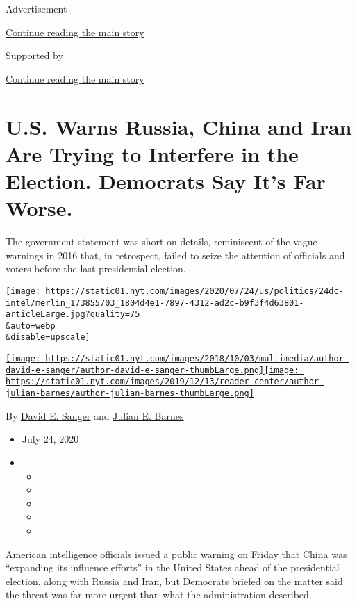 Advertisement

\protect\hyperlink{after-top}{Continue reading the main story}

Supported by

\protect\hyperlink{after-sponsor}{Continue reading the main story}

\hypertarget{us-warns-russia-china-and-iran-are-trying-to-interfere-in-the-election-democrats-say-its-far-worse}{%
\section{U.S. Warns Russia, China and Iran Are Trying to Interfere in
the Election. Democrats Say It's Far
Worse.}\label{us-warns-russia-china-and-iran-are-trying-to-interfere-in-the-election-democrats-say-its-far-worse}}

The government statement was short on details, reminiscent of the vague
warnings in 2016 that, in retrospect, failed to seize the attention of
officials and voters before the last presidential election.

\texttt{[image: https://static01.nyt.com/images/2020/07/24/us/politics/24dc-intel/merlin\_173855703\_1804d4e1-7897-4312-ad2c-b9f3f4d63801-articleLarge.jpg?quality=75\\\&auto=webp\\\&disable=upscale]}

\href{https://www.nytimes.com/by/david-e-sanger}{\texttt{[image: https://static01.nyt.com/images/2018/10/03/multimedia/author-david-e-sanger/author-david-e-sanger-thumbLarge.png]}}\href{https://www.nytimes.com/by/julian-e-barnes}{\texttt{[image: https://static01.nyt.com/images/2019/12/13/reader-center/author-julian-barnes/author-julian-barnes-thumbLarge.png]}}

By \href{https://www.nytimes.com/by/david-e-sanger}{David E. Sanger} and
\href{https://www.nytimes.com/by/julian-e-barnes}{Julian E. Barnes}

\begin{itemize}
\item
  July 24, 2020
\item
  \begin{itemize}
  \item
  \item
  \item
  \item
  \item
  \end{itemize}
\end{itemize}

American intelligence officials issued a public warning on Friday that
China was ``expanding its influence efforts'' in the United States ahead
of the presidential election, along with Russia and Iran, but Democrats
briefed on the matter said the threat was far more urgent than what the
administration described.

